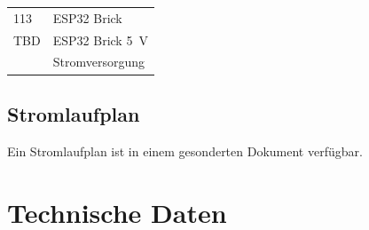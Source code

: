 \documentclass[a4paper,10pt]{article}
\begin{document}
\begin{multicols*}{2}
\begin{tabular}{ll}
		113                                                                                                                      & ESP32 Brick                                           \\
		TBD                                                                                                                      & ESP32 Brick \SI{5}{\volt}                             \\
		                                                                                                                         & Stromversorgung                                       \\
		\bottomrule
	\end{tabular}

	\subsection{Stromlaufplan}
	Ein Stromlaufplan ist in einem gesonderten Dokument verfügbar.

	\section{Technische Daten}

	\begin{minipage}{\linewidth}


\end{minipage}
\end{multicols*}
\end{document}
